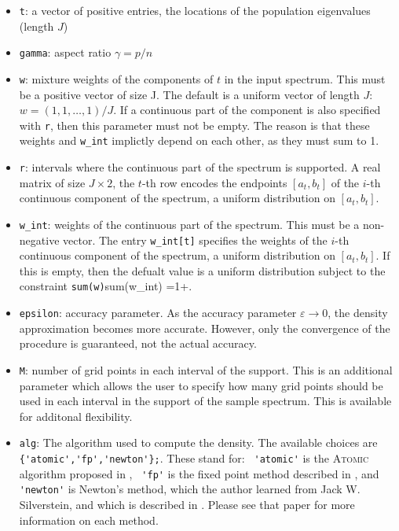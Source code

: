 \documentclass[english,11pt]{article} %
\begin{document}
\begin{itemize}
\item \verb+t+:  a vector of positive entries, the locations of the population eigenvalues (length $J$)
\item \verb+gamma+:  aspect ratio $\gamma = p/n$
\item \verb+w+: mixture weights of the components of $t$ in the input spectrum. This must be a positive vector of size J. The default is a uniform vector of length $J$: $w = (1,1,\ldots,1)/J$. If a continuous part of the component is also specified with \verb+r+, then this parameter must not be empty. The reason is that these weights and \verb+w_int+ implictly depend on each other, as they must sum to 1.

\item \verb+r+: intervals where the continuous part of the spectrum is supported.
       A real matrix of size $J \times 2$, the $t$-th row encodes the endpoints $[a_t,b_t]$ of the $i$-th continuous component of the spectrum, a uniform distribution on $[a_t,b_t]$.
\item \verb+w_int+:   weights of the continuous part of the spectrum. This must be a non-negative vector. The entry \verb+w_int[t]+ specifies the weights of the $i$-th continuous component of the spectrum, a uniform distribution on $[a_t,b_t]$. If this is empty, then the defualt value is a uniform distribution subject to the constraint \verb+sum(w)+sum(w\_int) =1+.
\item \verb+epsilon+: accuracy parameter. As the accuracy parameter $\varepsilon \to 0$, the density approximation becomes more accurate. However, only the convergence of the procedure is guaranteed, not the actual accuracy. 
\item \verb+M+:  number of grid points in each interval of the support. This is an additional parameter which allows the user to specify how many grid points should be used in each interval in the support of the sample spectrum. This is available for additonal flexibility. 
\item \verb+alg+: The algorithm used to compute the density. The available choices are \verb+ {'atomic','fp','newton'};+. These stand for: \verb+ 'atomic'+ is the \textsc{Atomic} algorithm proposed in \cite{dobriban2015precise}, \verb+ 'fp'+ is the fixed point method described in \cite{couillet2011deterministic}, and \verb+ 'newton'+ is Newton's method, which the author learned from Jack W. Silverstein, and which is described in \cite{dobriban2015precise}. Please see that paper for more information on each method. 
\end{itemize}
\end{document}
